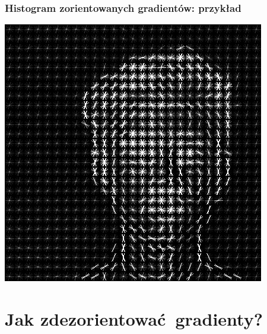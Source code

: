 \documentclass{beamer}
\begin{document}
            \begin{frame}
                \frametitle{Histogram zorientowanych gradientów: przykład}
                \begin{center}
                    \includegraphics[height=0.8\textheight]{pictures/hog_exposed.png}
                \end{center}
            \end{frame}

    \section{Jak zdezorientować gradienty?}
\end{document}

